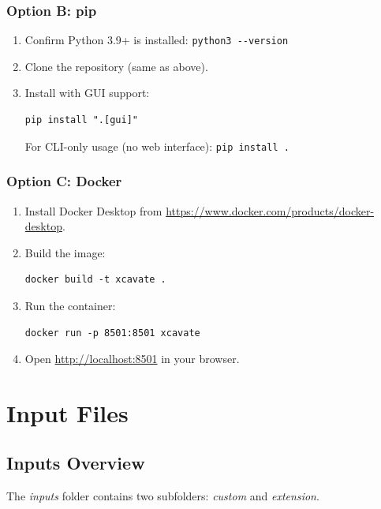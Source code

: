 \documentclass[11pt,letterpaper]{article}
\newcommand{\code}[1]{\texttt{#1}}
\begin{document}
\subsubsection{Option B: pip}

\begin{enumerate}[leftmargin=*]
    \item Confirm Python 3.9+ is installed: \code{python3 -{}-version}
    \item Clone the repository (same as above).
    \item Install with GUI support:
    \begin{lstlisting}
pip install ".[gui]"
    \end{lstlisting}
    For CLI-only usage (no web interface): \code{pip install .}
\end{enumerate}

\subsubsection{Option C: Docker}

\begin{enumerate}[leftmargin=*]
    \item Install Docker Desktop from \url{https://www.docker.com/products/docker-desktop}.
    \item Build the image:
    \begin{lstlisting}
docker build -t xcavate .
    \end{lstlisting}
    \item Run the container:
    \begin{lstlisting}
docker run -p 8501:8501 xcavate
    \end{lstlisting}
    \item Open \url{http://localhost:8501} in your browser.
\end{enumerate}

\section{Input Files}
\label{sec:inputs}

\subsection{Inputs Overview}

The \textit{inputs} folder contains two subfolders: \textit{custom} and
\textit{extension}.
\end{document}
